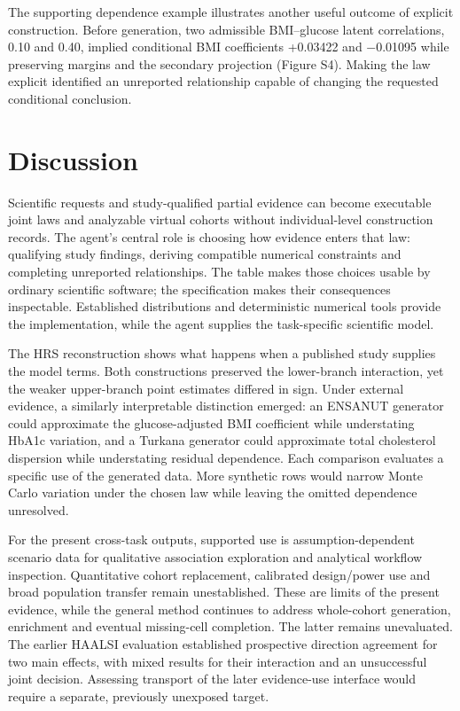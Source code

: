 \documentclass[sigconf,anonymous,review]{acmart}
\begin{document}
The supporting dependence example illustrates another useful outcome of explicit construction. Before generation, two admissible BMI–\allowbreak{}glucose latent correlations, 0.10 and 0.40, implied conditional BMI coefficients +0.03422 and −0.01095 while preserving margins and the secondary projection (Figure S4). Making the law explicit identified an unreported relationship capable of changing the requested conditional conclusion.


\section{Discussion}

Scientific requests and study-qualified partial evidence can become executable joint laws and analyzable virtual cohorts without individual-level construction records. The agent's central role is choosing how evidence enters that law: qualifying study findings, deriving compatible numerical constraints and completing unreported relationships. The table makes those choices usable by ordinary scientific software; the specification makes their consequences inspectable. Established distributions and deterministic numerical tools provide the implementation, while the agent supplies the task-specific scientific model.


The HRS reconstruction shows what happens when a published study supplies the model terms. Both constructions preserved the lower-branch interaction, yet the weaker upper-branch point estimates differed in sign. Under external evidence, a similarly interpretable distinction emerged: an ENSANUT generator could approximate the glucose-adjusted BMI coefficient while understating HbA1c variation, and a Turkana generator could approximate total cholesterol dispersion while understating residual dependence. Each comparison evaluates a specific use of the generated data. More synthetic rows would narrow Monte Carlo variation under the chosen law while leaving the omitted dependence unresolved.


For the present cross-task outputs, supported use is assumption-dependent scenario data for qualitative association exploration and analytical workflow inspection. Quantitative cohort replacement, calibrated design/\allowbreak{}power use and broad population transfer remain unestablished. These are limits of the present evidence, while the general method continues to address whole-cohort generation, enrichment and eventual missing-cell completion. The latter remains unevaluated. The earlier HAALSI evaluation established prospective direction agreement for two main effects, with mixed results for their interaction and an unsuccessful joint decision. Assessing transport of the later evidence-use interface would require a separate, previously unexposed target.
\end{document}
